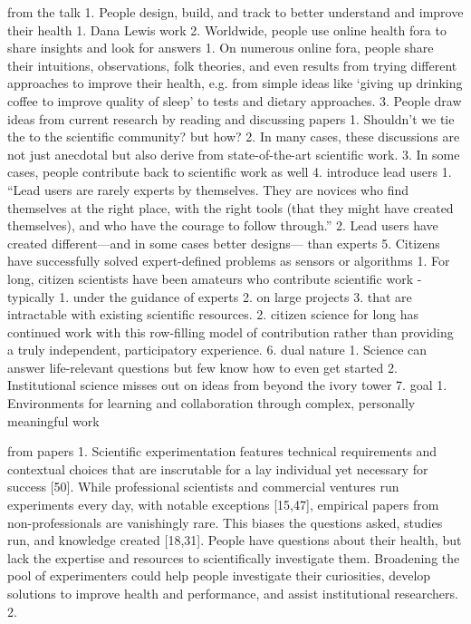 from the talk
1. People design, build, and track to better understand and improve their health
    1. Dana Lewis work
2. Worldwide, people use online health fora to share insights and look for answers
    1. On numerous online fora, people share their intuitions, observations, folk theories, and even results from trying different approaches to improve their health, e.g. from simple ideas like ‘giving up drinking coffee to improve quality of sleep’ to tests and dietary approaches. 
3. People draw ideas from current research by reading and discussing papers
    1. Shouldn’t we tie the to the scientific community? but how?
    2. In many cases, these discussions are not just anecdotal but also derive from state-of-the-art scientific work.
    3. In some cases, people contribute back to scientific work as well
4. introduce lead users
    1. “Lead users are rarely experts by themselves. They are novices who find themselves at the right place, with the right tools (that they might have created themselves), and who have the courage to follow through.”
    2. Lead users have created different—and in some cases better designs— than experts 
5. Citizens have successfully solved expert-defined problems as sensors or algorithms
    1. For long, citizen scientists have been amateurs who contribute scientific work - typically
        1.  under the guidance of experts 
        2.  on large projects
        3.  that are intractable with existing scientific resources.
    2. citizen science for long has continued work with this row-filling model of contribution rather than providing a truly independent, participatory experience. 
6. dual nature
    1. Science can answer life-relevant questions 
but few know how to even get started
    2. Institutional science misses out on ideas from beyond the ivory tower
7. goal
    1. Environments for learning and collaboration through complex, personally meaningful work

from papers
1. Scientific experimentation features technical requirements and contextual choices that are inscrutable for a lay individual yet necessary for success [50]. While professional scientists and commercial ventures run experiments every day, with notable exceptions [15,47], empirical papers from non-professionals are vanishingly rare. This biases the questions asked, studies run, and knowledge created [18,31]. People have questions about their health, but lack the expertise and resources to scientifically investigate them. Broadening the pool of experimenters could help people investigate their curiosities, develop solutions to improve health and performance, and assist institutional researchers.
2. 

